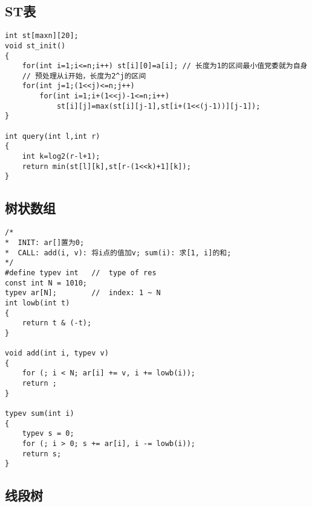 \subsection{ST表}
\begin{lstlisting}
int st[maxn][20];
void st_init()
{
	for(int i=1;i<=n;i++) st[i][0]=a[i]; // 长度为1的区间最小值党委就为自身
	// 预处理从i开始，长度为2^j的区间
	for(int j=1;(1<<j)<=n;j++)
		for(int i=1;i+(1<<j)-1<=n;i++)
			st[i][j]=max(st[i][j-1],st[i+(1<<(j-1))][j-1]);
}

int query(int l,int r)
{
	int k=log2(r-l+1);
	return min(st[l][k],st[r-(1<<k)+1][k]);
}
\end{lstlisting}


\subsection{树状数组}
\begin{lstlisting}
/*
*  INIT: ar[]置为0;
*  CALL: add(i, v): 将i点的值加v; sum(i): 求[1, i]的和;
*/
#define typev int   //  type of res
const int N = 1010;
typev ar[N];        //  index: 1 ~ N
int lowb(int t)
{
	return t & (-t);
}

void add(int i, typev v)
{
	for (; i < N; ar[i] += v, i += lowb(i));
	return ;
}

typev sum(int i)
{
	typev s = 0;
	for (; i > 0; s += ar[i], i -= lowb(i));
	return s;
}
\end{lstlisting}

\subsection{线段树}
